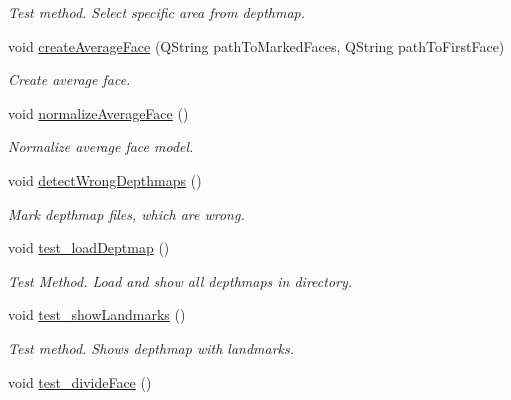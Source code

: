 \begin{DoxyCompactItemize}
\begin{DoxyCompactList}\small\item\em Test method. Select specific area from depthmap. \end{DoxyCompactList}\item 
void \hyperlink{class_run_ab7903601c85b9680f5aafbca56c5631e}{create\+Average\+Face} (Q\+String path\+To\+Marked\+Faces, Q\+String path\+To\+First\+Face)
\begin{DoxyCompactList}\small\item\em Create average face. \end{DoxyCompactList}\item 
\hypertarget{class_run_abf995052296546d5fef9d2ff08a95845}{void \hyperlink{class_run_abf995052296546d5fef9d2ff08a95845}{normalize\+Average\+Face} ()}\label{class_run_abf995052296546d5fef9d2ff08a95845}

\begin{DoxyCompactList}\small\item\em Normalize average face model. \end{DoxyCompactList}\item 
\hypertarget{class_run_a4197f92adae5ba29f601e47e18a6541c}{void \hyperlink{class_run_a4197f92adae5ba29f601e47e18a6541c}{detect\+Wrong\+Depthmaps} ()}\label{class_run_a4197f92adae5ba29f601e47e18a6541c}

\begin{DoxyCompactList}\small\item\em Mark depthmap files, which are wrong. \end{DoxyCompactList}\item 
\hypertarget{class_run_a98b7642853513b50495463fa4b1be932}{void \hyperlink{class_run_a98b7642853513b50495463fa4b1be932}{test\+\_\+load\+Deptmap} ()}\label{class_run_a98b7642853513b50495463fa4b1be932}

\begin{DoxyCompactList}\small\item\em Test Method. Load and show all depthmaps in directory. \end{DoxyCompactList}\item 
\hypertarget{class_run_a54e84bcda33688043ad879738e98679e}{void \hyperlink{class_run_a54e84bcda33688043ad879738e98679e}{test\+\_\+show\+Landmarks} ()}\label{class_run_a54e84bcda33688043ad879738e98679e}

\begin{DoxyCompactList}\small\item\em Test method. Shows depthmap with landmarks. \end{DoxyCompactList}\item 
\hypertarget{class_run_a58e6802e67cf8eb2a4f9a60324743f36}{void \hyperlink{class_run_a58e6802e67cf8eb2a4f9a60324743f36}{test\+\_\+divide\+Face} ()}\label{class_run_a58e6802e67cf8eb2a4f9a60324743f36}


\end{DoxyCompactItemize}
